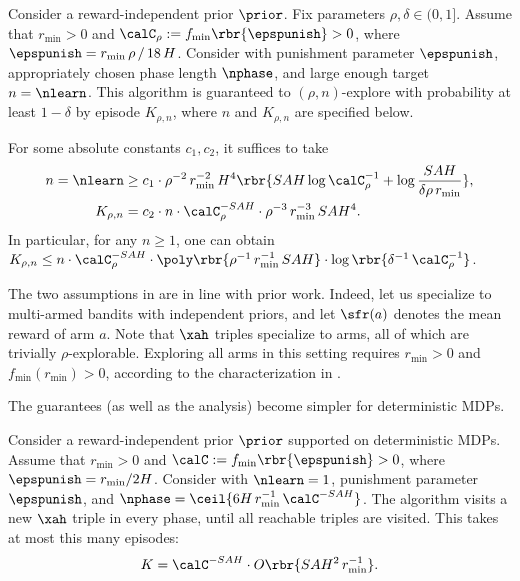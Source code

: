 \begin{theorem}\label{thm:main_indep}
Consider a reward-independent prior $\prior$. Fix parameters $\rho, \delta\in (0,1]$. Assume that $r_{\min}>0$ and
    $\calC_{\rho}  := f_{\min}\rbr{ \epspunish}>0$,
where
    $\epspunish = r_{\min}\,\rho\,/\, 18\,H$.
Consider  with punishment parameter $\epspunish$, appropriately chosen phase length $\nphase$, and large enough target $n=\nlearn$. This algorithm is guaranteed to $(\rho,n)$-explore with probability at least $1-\delta$ by episode $K_{\rho,n}$, where $n$ and $K_{\rho,n}$ are specified below.


For some absolute constants $c_1,c_2$, it suffices to take
\begin{align*}
n = \nlearn &\ge
     c_1\cdot \rho^{-2}\, r_{\min}^{-2}\,
     H^4 \rbr{ SAH \log \calC_{\rho}^{-1} +
        \log \frac{ SAH}{\delta\rho\, r_{\min}} }, \\
K_{\rho,n} &= c_2\cdot n\cdot \calC_{\rho}^{-SAH} \cdot \rho^{-3}\, r_{\min}^{-3}\, SAH^4.
\end{align*}
In particular, for any $n\geq 1$, one can obtain
    $K_{\rho,n} \leq n\cdot  \calC_{\rho}^{-SAH}
        \cdot \poly\rbr{\rho^{-1}\, r_{\min}^{-1}\, SAH  }
        \cdot \log\rbr{\delta^{-1}\,\calC_{\rho}^{-1}}$.
\end{theorem}

\begin{remark}The two assumptions in  are in line with prior work. Indeed, let us specialize to multi-armed bandits with independent priors, and let $\sfr(a)$ denotes the mean reward of arm $a$. Note that $\xah$ triples specialize to arms, all of which are trivially $\rho$-explorable. Exploring all arms in this setting requires $r_{\min}>0$ and $f_{\min}(r_{\min})>0$, according to the characterization in \citet{Selke-PoIE-ec21}.
\end{remark}

The guarantees (as well as the analysis) become simpler for deterministic MDPs.

\begin{theorem}\label{thm:det_mdp}
Consider a reward-independent prior $\prior$ supported on deterministic MDPs.
Assume that $r_{\min}>0$ and
    $\calC  := f_{\min}\rbr{ \epspunish}>0$,
where
    $\epspunish = r_{\min}/2H$.
Consider  with $\nlearn = 1$, punishment parameter $\epspunish$,  and
    $\nphase = \ceil{ 6H\,r_{\min}^{-1}\,\calC^{-SAH} }$.
The algorithm visits a new $\xah$ triple in every phase, until all reachable triples are visited. This takes at most this many episodes:
    \[ K = \calC^{-SAH}\cdot O\rbr{ SAH^2\, r_{\min}^{-1} }.\]
\end{theorem}

